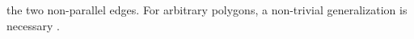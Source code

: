 the two non-parallel edges. For arbitrary polygons, a non-trivial 
generalization is necessary \cite{Wachspress1975}.
